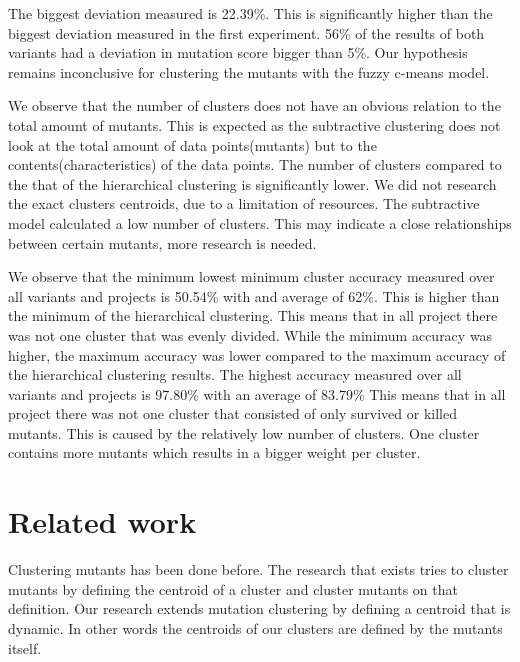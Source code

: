 \documentclass[conference,draftclsnofoot,onecolumn]{IEEEtran}
\begin{document}
The biggest deviation measured is 22.39\%.
This is significantly higher than the biggest deviation measured in the first experiment. 56\% of the results of both variants had a deviation in mutation score bigger than 5\%. Our hypothesis remains inconclusive for clustering the mutants with the fuzzy c-means model.

We observe that the number of clusters does not have an obvious relation to the total amount of mutants. 
This is expected as the subtractive clustering does not look at the total amount of data points(mutants) but to the contents(characteristics) of the data points.
The number of clusters compared to the that of the hierarchical clustering is significantly lower.
We did not research the exact clusters centroids, due to a limitation of resources.
The subtractive model calculated a low number of clusters.
This may indicate a close relationships between certain mutants, more research is needed.

We observe that the minimum lowest minimum cluster accuracy measured over all variants and projects is 50.54\% with and average of 62\%. 
This is higher than the minimum of the hierarchical clustering.
This means that in all project there was not one cluster that was evenly divided.
While the minimum accuracy was higher, the maximum accuracy was lower compared to the maximum accuracy of the hierarchical clustering results.
The highest accuracy measured over all variants and projects is 97.80\% with an average of 83.79\%
This means that in all project there was not one cluster that consisted of only survived or killed mutants.
This is caused by the relatively low number of clusters.
One cluster contains more mutants which results in a bigger weight per cluster.
\section{Related work}
\label{ch:related_work}
Clustering mutants has been done before.
The research that exists tries to cluster mutants by defining the centroid of a cluster and cluster mutants on that definition.
Our research extends mutation clustering by defining a centroid that is dynamic.
In other words the centroids of our clusters are defined by the mutants itself.
\end{document}
